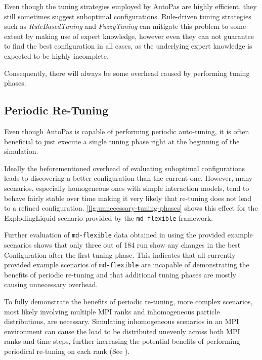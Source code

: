 \documentclass[conference]{IEEEtran}
\begin{document}
Even though the tuning strategies employed by AutoPas are highly efficient, they still sometimes suggest suboptimal configurations. Rule-driven tuning strategies such as \textit{RuleBasedTuning} and \textit{FuzzyTuning} can mitigate this problem to some extent by making use of expert knowledge, however even they can not guarantee to find the best configuration in all cases, as the underlying expert knowledge is expected to be highly incomplete.

Consequently, there will always be some overhead caused by performing tuning phases.

\subsection*{Periodic Re-Tuning}

Even though AutoPas is capable of performing periodic auto-tuning, it is often beneficial to just execute a single tuning phase right at the beginning of the simulation.

Ideally the beforementioned overhead of evaluating suboptimal configurations leads to discovering a better configuration than the current one. However, many scenarios, especially homogeneous ones with simple interaction models, tend to behave fairly stable over time making it very likely that re-tuning does not lead to a refined configuration. \autoref{fig:unnecessary-tuning-phases} shows this effect for the ExplodingLiquid scenario provided by the \texttt{md-flexible} framework.

Further evaluation of \texttt{md-flexible} data obtained in \cite{lerchner2024} using the provided example scenarios shows that only three out of 184 run show any changes in the best Configuration after the first tuning phase. This indicates that all currently provided example scenarios of \texttt{md-flexible} are incapable of demonstrating the benefits of periodic re-tuning and that additional tuning phases are mostly causing unnecessary overhead.

To fully demonstrate the benefits of periodic re-tuning, more complex scenarios, most likely involving multiple MPI ranks and inhomogeneous particle distributions, are necessary. Simulating inhomogeneous scenarios in an MPI environment can cause the load to be distributed unevenly across both MPI ranks and time steps, further increasing the potential benefits of performing periodical re-tuning on each rank (See \cite{Newcome2023Poster}).
\end{document}
